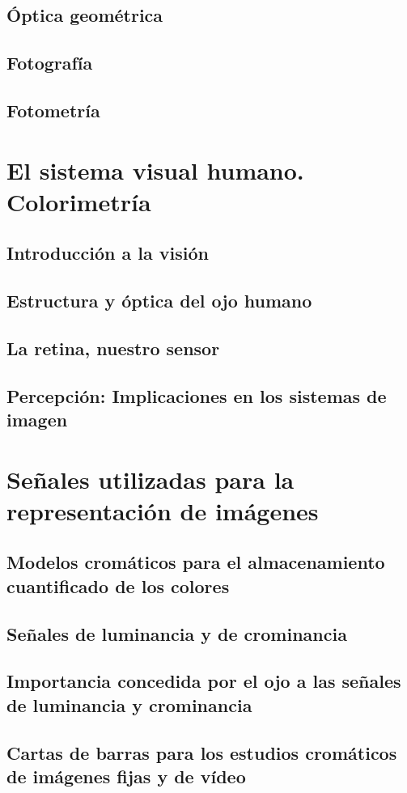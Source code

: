 \documentclass[a4paper]{book}
\begin{document}
\section{Óptica geométrica}
\section{Fotografía}
\section{Fotometría}

\chapter{El sistema visual humano. Colorimetría}
\section{Introducción a la visión}
\section{Estructura y óptica del ojo humano}
\section{La retina, nuestro sensor}
\section{Percepción: Implicaciones en los sistemas de imagen}

\chapter{Señales utilizadas para la representación de imágenes}
\section{Modelos cromáticos para el almacenamiento cuantificado de los colores}
\section{Señales de luminancia y de crominancia}
\section{Importancia concedida por el ojo a las señales de luminancia y crominancia}
\section{Cartas de barras para los estudios cromáticos de imágenes fijas y de vídeo}
\end{document}
